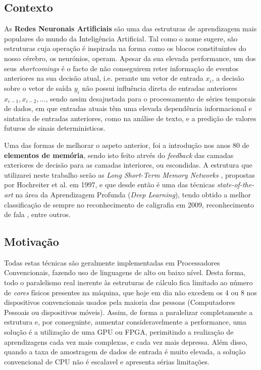 \documentclass[a4paper, onecolumn, 10pt]{article}
\begin{document}
	\subsection{Contexto}
	As \textbf{Redes Neuronais Artificiais} são uma das estruturas de aprendizagem mais populares do mundo da Inteligência Artificial. Tal como o nome sugere, são estruturas cuja operação é inspirada na forma como os blocos constituintes do nosso cérebro, os neurónios, operam. Apesar da sua elevada performance, um dos seus \textit{shortcomings} é o facto de não conseguirem reter informação de eventos anteriores na sua decisão atual, i.e. perante um vetor de entrada $x_i$, a decisão sobre o vetor de saída $y_i$ não possui influência direta de entradas anteriores $x_{i-1}, x_{i-2}, ...$, sendo assim desajustada para o processamento de séries temporais de dados, em que entradas atuais têm uma elevada dependência informacional e sintatica de entradas anteriores, como na análise de texto, e a predição de valores futuros de sinais deterministicos.

	Uma das formas de melhorar o aspeto anterior, foi a introdução nos anos 80 de \textbf{elementos de memória}, sendo isto feito atrvés do \textit{feedback} das camadas exteriores de decisão para as camadas interiores, ou escondidas. A estrutura que utilizarei neste trabalho serão as \textit{Long Short-Term Memory Networks} \autocite{hochreiter-lstm}, propostas por Hochreiter et al. em 1997, e que desde então é uma das técnicas \textit{state-of-the-art} na área da Aprendizagem Profunda (\textit{Deep Learning}), tendo obtido a melhor classificação de sempre no reconhecimento de caligrafia \autocite{hochreiter-hrr} em 2009, reconhecimento de fala \autocite{speechRec-lstm}, entre outros.  

	\subsection{Motivação}
	Todas estas técnicas são geralmente implementadas em Processadores Convencionais, fazendo uso de linguagens de alto ou baixo nível. Desta forma, todo o paralelismo real inerente às estruturas de cálculo fica limitado ao número de \textit{cores} físicos presentes na máquina, que hoje em dia não excedem os 4 ou 8 nos dispositivos convencionais usados pela maioria das pessoas (Computadores Pessoais ou dispositivos móveis). Assim, de forma a paralelizar completamente a estrutura e, por conseguinte, aumentar consideravelmente a performance, uma solução é a utilização de uma GPU ou FPGA, perimitindo a realização de aprendizagens cada vez mais complexas, e cada vez mais depressa. Além disso, quando a taxa de amostragem de dados de entrada é muito elevada, a solução convencional de CPU não é escalavel e apresenta sérias limitações. 
	
\end{document}
